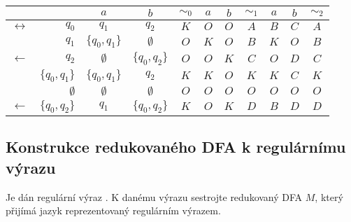 \begin{tabular}{|r r|c c||c|c c||c|c c||c|}
    \hline
    &  & $a$ & $b$ & $ \sim_0 $ & $a$ & $b$ & $\sim_1$ & $a$ & $b$ & $\sim_2$\\ \hline \hline
    $\leftrightarrow$& $q_0$          & $q_1$          & $q_2$          & $K$ & $O$ & $O$ & $A$ & $B$ & $C$ & $A$ \\
                     & $q_1$          & $\{q_0, q_1\}$ & $\emptyset$    & $O$ & $K$ & $O$ & $B$ & $K$ & $O$ & $B$ \\
              $\gets$& $q_2$          & $\emptyset$    & $\{q_0, q_2\}$ & $O$ & $O$ & $K$ & $C$ & $O$ & $D$ & $C$ \\
                     & $\{q_0, q_1\}$ & $\{q_0, q_1\}$ & $q_2$          & $K$ & $K$ & $O$ & $K$ & $K$ & $C$ & $K$ \\
                     & $\emptyset$    & $\emptyset$    & $\emptyset$    & $O$ & $O$ & $O$ & $O$ & $O$ & $O$ & $O$ \\
              $\gets$& $\{q_0, q_2\}$ & $q_1$          & $\{q_0, q_2\}$ & $K$ & $O$ & $K$ & $D$ & $B$ & $D$ & $D$ \\
    \hline
\end{tabular}



\subsection{Konstrukce redukovaného DFA k regulárnímu výrazu}
Je dán regulární výraz . K danému výrazu sestrojte redukovaný DFA $M$,
který přijímá jazyk reprezentovaný regulárním výrazem.

